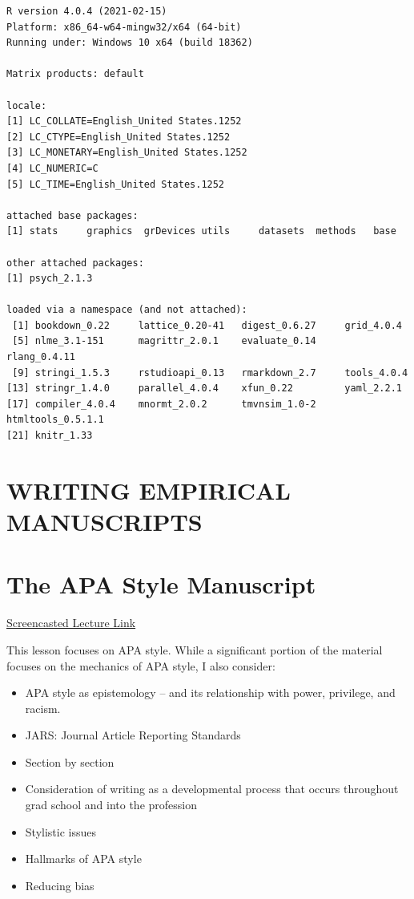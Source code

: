 \documentclass[
  english,
]{book}
\providecommand{\tightlist}{%
  \setlength{\itemsep}{0pt}\setlength{\parskip}{0pt}}
\begin{document}
\begin{verbatim}
R version 4.0.4 (2021-02-15)
Platform: x86_64-w64-mingw32/x64 (64-bit)
Running under: Windows 10 x64 (build 18362)

Matrix products: default

locale:
[1] LC_COLLATE=English_United States.1252 
[2] LC_CTYPE=English_United States.1252   
[3] LC_MONETARY=English_United States.1252
[4] LC_NUMERIC=C                          
[5] LC_TIME=English_United States.1252    

attached base packages:
[1] stats     graphics  grDevices utils     datasets  methods   base     

other attached packages:
[1] psych_2.1.3

loaded via a namespace (and not attached):
 [1] bookdown_0.22     lattice_0.20-41   digest_0.6.27     grid_4.0.4       
 [5] nlme_3.1-151      magrittr_2.0.1    evaluate_0.14     rlang_0.4.11     
 [9] stringi_1.5.3     rstudioapi_0.13   rmarkdown_2.7     tools_4.0.4      
[13] stringr_1.4.0     parallel_4.0.4    xfun_0.22         yaml_2.2.1       
[17] compiler_4.0.4    mnormt_2.0.2      tmvnsim_1.0-2     htmltools_0.5.1.1
[21] knitr_1.33       
\end{verbatim}

\hypertarget{writing-empirical-manuscripts}{%
\chapter*{WRITING EMPIRICAL MANUSCRIPTS}\label{writing-empirical-manuscripts}}

\hypertarget{APAstyle}{%
\chapter{The APA Style Manuscript}\label{APAstyle}}

\href{https://spu.hosted.panopto.com/Panopto/Pages/Viewer.aspx?pid=8ca9d96d-0ff6-4068-a570-ac290189a4d4}{Screencasted Lecture Link}

This lesson focuses on APA style. While a significant portion of the material focuses on the mechanics of APA style, I also consider:

\begin{itemize}
\tightlist
\item
  APA style as epistemology -- and its relationship with power, privilege, and racism.
\item
  JARS: Journal Article Reporting Standards
\item
  Section by section
\item
  Consideration of writing as a developmental process that occurs throughout grad school and into the profession
\item
  Stylistic issues
\item
  Hallmarks of APA style
\item
  Reducing bias
\end{itemize}
\end{document}
